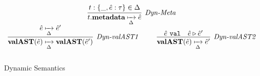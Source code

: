 %

\begin{figure}[t]
\centering
\[
\begin{array}{c}
\infer[\textit{Dyn-Meta}]
	{t.\keyw{metadata} \xmapsto[\Delta]{} \hat{e}} 
	{t:\{\_,\hat{e}:\tau \} \in \Delta}\\[1ex]

\infer[\textit{Dyn-valAST1}]
	{\keyw{valAST}(\hat{e}) \xmapsto[\Delta]{} \keyw{valAST}(\hat{e}') } 
	{\hat{e} \xmapsto[\Delta]{} \hat{e}'}
~~~~~~~~
\infer[\textit{Dyn-valAST2}]
	{\keyw{valAST}(\hat{e}) \xmapsto[\Delta]{} \hat{e}' } 
	{\hat{e}\ \texttt{val} &\hat{e} \triangleright \hat{e}' }\\[3ex]
\end{array}
\]
\label{fig:dynsemantics}
\vspace{-15px}
\caption{Dynamic Semantics }
\end{figure}



